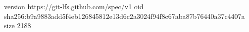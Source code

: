 version https://git-lfs.github.com/spec/v1
oid sha256:b9a9883add5f4eb126845812e13d6c2a3024f94f8c67aba87b76440a37c4407a
size 2188

